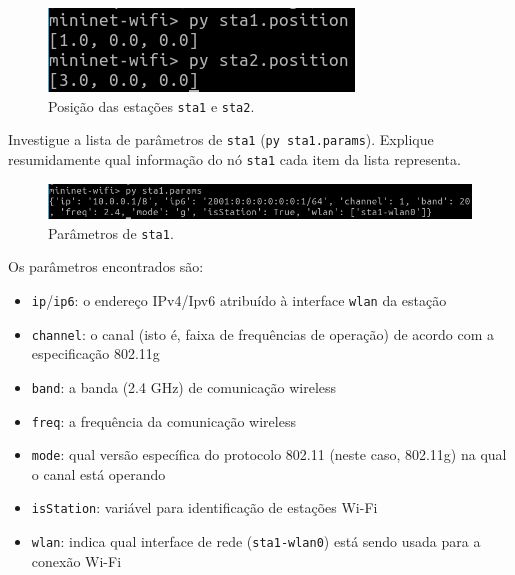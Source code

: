 \documentclass{article}
\begin{document}
\begin{figure}[!htb]
\centering
\includegraphics[width=\columnwidth]{images/p2_position.png}
\caption{Posição das estações \texttt{sta1} e \texttt{sta2}.}
\end{figure}

\FloatBarrier

\begin{tcolorbox}
    Investigue a lista de parâmetros de \texttt{sta1} (\texttt{py sta1.params}).
    Explique resumidamente qual informação do nó \texttt{sta1} cada item da lista representa.
\end{tcolorbox}

\begin{figure}[!htb]
\centering
\includegraphics[width=\columnwidth]{images/p2_params.png}
\caption{Parâmetros de \texttt{sta1}.}
\end{figure}

Os parâmetros encontrados são:

\begin{itemize}
    \item \texttt{ip}/\texttt{ip6}: o endereço IPv4/Ipv6 atribuído à interface \texttt{wlan}
          da estação
    \item \texttt{channel}: o canal (isto é, faixa de frequências de operação) de
          acordo com a especificação 802.11g
    \item \texttt{band}: a banda (2.4 GHz) de comunicação wireless
    \item \texttt{freq}: a frequência da comunicação wireless
    \item \texttt{mode}: qual versão específica do protocolo 802.11 (neste caso,
          802.11g) na qual o canal está operando
    \item \texttt{isStation}: variável para identificação de estações Wi-Fi
    \item \texttt{wlan}: indica qual interface de rede (\texttt{sta1-wlan0}) está
          sendo usada para a conexão Wi-Fi


\end{itemize}
\end{document}
